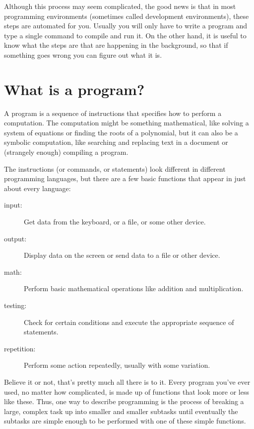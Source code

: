 Although this process may seem complicated, the good news is that in
most programming environments (sometimes called development
environments), these steps are automated for you.  Usually you will
only have to write a program and type a single command to compile and
run it.  On the other hand, it is useful to know what the steps are
that are happening in the background, so that if something goes wrong
you can figure out what it is.

\section{What is a program?}

A program is a sequence of instructions that specifies how to perform
a computation.  The computation might be something mathematical, like
solving a system of equations or finding the roots of a polynomial,
but it can also be a symbolic computation, like searching and
replacing text in a document or (strangely enough) compiling a
program.


The instructions (or commands, or statements) look different in
different programming languages, but there are a few basic functions
that appear in just about every language:

\begin{description}

\item[input:] Get data from the keyboard, or a file, or some
other device.

\item[output:] Display data on the screen or send data to a
file or other device.

\item[math:] Perform basic mathematical operations like addition and
multiplication.

\item[testing:] Check for certain conditions and execute the
appropriate sequence of statements.

\item[repetition:] Perform some action repeatedly, usually with
some variation.

\end{description}

Believe it or not, that's pretty much all there is to it.
Every program you've ever used, no matter how complicated, is
made up of functions that look more or less like these.  Thus,
one way to describe programming is the process of breaking a
large, complex task up into smaller and smaller subtasks
until eventually the subtasks are simple enough to be performed
with one of these simple functions.

